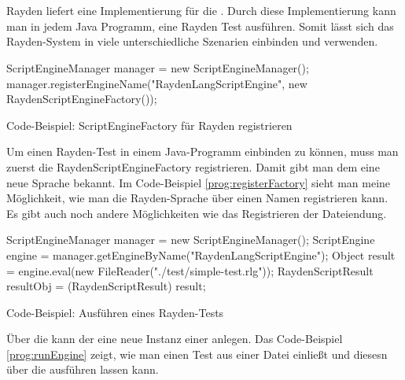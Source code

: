 \todo


\section{}

Rayden liefert eine Implementierung für die . Durch diese Implementierung kann man in jedem Java Programm, eine Rayden Test ausführen. Somit lässt sich das Rayden-System in viele unterschiedliche Szenarien einbinden und verwenden. 

\begin{program}
\begin{JavaCode}
ScriptEngineManager manager = new ScriptEngineManager();
manager.registerEngineName("RaydenLangScriptEngine", new RaydenScriptEngineFactory());
\end{JavaCode}
\caption{Code-Beispiel: ScriptEngineFactory für Rayden registrieren}
\label{prog:registerFactory}
\end{program}

\SuperPar
Um einen Rayden-Test in einem Java-Programm einbinden zu können, muss man zuerst die RaydenScriptEngineFactory registrieren. Damit gibt man dem  eine neue Sprache bekannt. Im Code-Beispiel \ref{prog:registerFactory} sieht man meine Möglichkeit, wie man die Rayden-Sprache über einen Namen registrieren kann. Es gibt auch noch andere Möglichkeiten wie das Registrieren der Dateiendung.

\begin{program}
\begin{JavaCode}
ScriptEngineManager manager = new ScriptEngineManager();
ScriptEngine engine = manager.getEngineByName("RaydenLangScriptEngine");
Object result =  engine.eval(new FileReader("./test/simple-test.rlg"));
RaydenScriptResult resultObj = (RaydenScriptResult) result;
\end{JavaCode}
\caption{Code-Beispiel: Ausführen eines Rayden-Tests}
\label{prog:runEngine}
\end{program}

\SuperPar
Über die  kann der  eine neue Instanz einer  anlegen. Das Code-Beispiel \ref{prog:runEngine} zeigt, wie man einen Test aus einer Datei einließt und diesesn über die  ausführen lassen kann.


